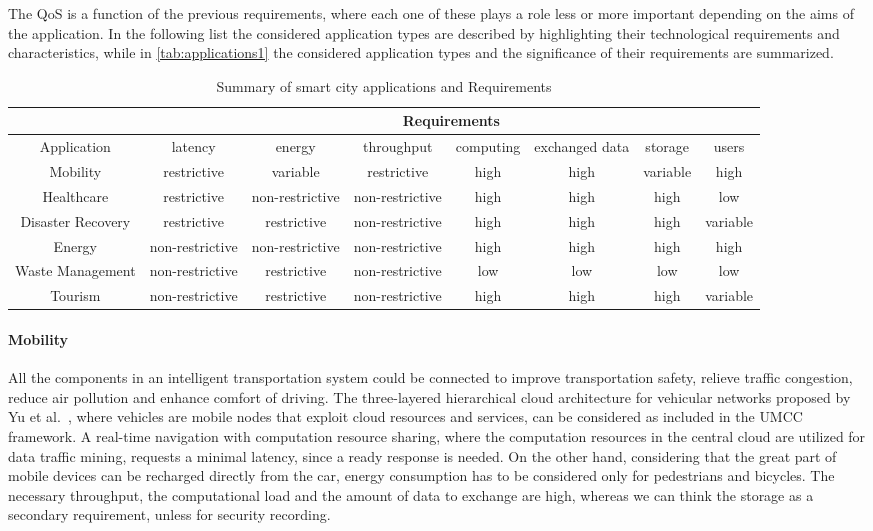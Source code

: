 \documentclass[twoside,openright]{report}
\begin{document}
The \gls{QoS} is a function of the previous requirements, where each one of these plays a role less or more important depending on the aims of the application. 
In the following list the considered application types are described by highlighting their technological requirements and characteristics, while in \autoref{tab:applications1} the considered application types and the significance of their requirements are summarized.
\begin{sidewaystable}
\renewcommand{\arraystretch}{2}
\centering
\caption{Summary of smart city applications and Requirements}
\label{tab:applications1}
{\begin{tabular}{c||c|c|c|c|c|c|c|}
& \multicolumn{7}{c|}{Requirements}\\\hline\hline
Application 		& latency 	 		& energy			& throughput 		& computing 	& exchanged data 	& storage   & users\\  \hline
Mobility 			& restrictive 		& variable			& restrictive		& high		& high			& variable	 & high	\\ 
Healthcare			& restrictive  	& non-restrictive 	& non-restrictive		& high			& high			& high		 & low	\\
Disaster Recovery	& restrictive 	& restrictive 		& non-restrictive		& high			& high			& high	 & variable	\\
Energy			& non-restrictive	& non-restrictive		& non-restrictive		& high			& high			& high	 & high	\\ 
Waste Management	& non-restrictive	& restrictive		& non-restrictive 	& low 			& low			& low	& low	\\
Tourism			& non-restrictive	& restrictive	& non-restrictive 	& high	& high	& high	& variable	\\
\hline
\end{tabular}
}
\end{sidewaystable}

\paragraph{Mobility}
All the components in an intelligent transportation system could be connected to improve transportation safety, relieve traffic congestion, reduce air pollution and enhance comfort of driving. 
The three-layered hierarchical cloud architecture for vehicular networks proposed by Yu et al.~\cite{Vehicular}, where vehicles are mobile nodes that exploit cloud resources and services, can be considered as included in the \gls{UMCC} framework. 
A real-time navigation with computation resource sharing, where the computation resources in the central cloud are utilized for data traffic mining, requests a minimal latency, since a ready response is needed. 
On the other hand, considering that the great part of mobile devices can be recharged directly from the car, energy consumption has to be considered only for pedestrians and bicycles. 
The necessary throughput, the computational load and the amount of data to exchange are high, whereas we can think the storage as a secondary requirement, unless for security recording.  
\end{document}
